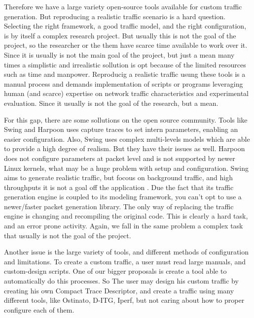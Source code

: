 Therefore we have a large variety open-source tools available for custom traffic generation. But reproducing a realistic traffic scenario is a hard question. Selecting the right framework, a good traffic model, and the right configuration, is by itself a complex research project\cite{legotg-paper}\cite{selfsimilar-ethernet}. But usually this is not the goal of the project, so the researcher or the them have scarce time available to work over it. Since it is usually is not the main goal of the project, but just a mean many times a simplistic and irrealistic sollution is opt because of the limited resources such as time and manpower.   Reproducig a realistic traffic usung these tools is a manual process and demands implementation of scripts or programs leveraging human (and scarce) expertise on network traffic characteristics  and experimental evaluation. Since it usually is not the goal of the research, but a mean. 


For this gap, there are some sollutions on the open source community. Tools like Swing and Harpoon uses capture traces to set intern parameters, enabling an easier configuration. Also, Swing uses complex multi-levels models which are able to provide a high degree of realism\cite{swing-paper}. But they have their issues as well. Harpoon does not configure parameters at packet level\cite{harpoon-paper} and is not supported by newer Linux kernels, what may be a huge problem with setup and configuration. Swing\cite{swing-paper} aims to generate realistic traffic, but focous on background traffic, and high throughputs it is not a goal off the application\cite{swing-paper} \cite{legotg-paper}. Due the fact that its traffic generation engine is coupled to its modeling framework, you can't opt to use a newer/faster packet generation library. The only way of replacing the traffic engine is changing and recompiling the original code. This is clearly a hard task\cite{legotg-paper}, and an error prone activity. Again, we fall in the same problem a complex task that usually is not the goal of the project. 

Another issue is the large variety of tools, and different methods of configuration and limitations. To create a custom traffic, a user must read large manuals, and custom-design scripts. One of our bigger proposals is create a tool able to automatically do this processes. So The user may design his custom traffic by creating his own Compact Trace Descriptor, and create a traffic using many different tools, like Ostinato, D-ITG, Iperf, but not caring about how to proper configure each of them. 


